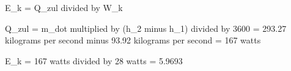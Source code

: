 E_k = Q_zul divided by W_k  

Q_zul = m_dot multiplied by (h_2 minus h_1) divided by 3600  
= 293.27 kilograms per second minus 93.92 kilograms per second  
= 167 watts  

E_k = 167 watts divided by 28 watts  
= 5.9693